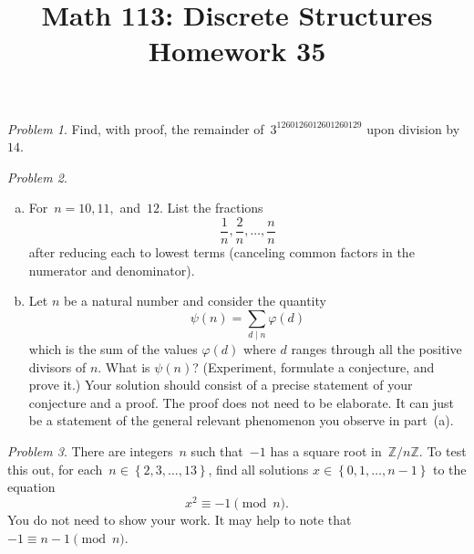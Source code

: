 \documentclass[11pt,twoside]{amsart}
\title{Math 113: Discrete Structures\\ Homework 35}
\theoremstyle{plain}
\theoremstyle{remark}
\newtheorem{prob}{Problem}
\theoremstyle{definition}
\theoremstyle{definition}
\newcommand{\ZZ}{\mathbb{Z}}
\begin{document}
\maketitle



\begin{prob}
  Find, with proof, the remainder of~$3^{1260126012601260129}$ upon division
  by~$14$.
\end{prob}

\begin{prob}\
  \begin{enumerate}[(a)]
    \item For~$n=10,11,$ and~$12$. List the fractions
      \[
	\frac{1}{n},\frac{2}{n},\dots,\frac{n}{n}
      \]
      after reducing each to lowest terms (canceling common factors in the
      numerator and denominator).
    \item Let $n$ be a natural number and consider the quantity
\[
  \psi(n)=\sum_{d\mid n}\varphi(d)
\]
which is the sum of the values $\varphi(d)$ where $d$ ranges through all the
positive divisors of $n$.  What is $\psi(n)$?  (Experiment, formulate a
conjecture, and prove it.) Your solution should consist of a precise statement
of your conjecture and a proof. The proof does not need to be elaborate.  It can
just be a statement of the general relevant phenomenon you observe in part~(a).
  \end{enumerate}
\end{prob}

\begin{prob} There are integers~$n$ such that~$-1$ has a square root in~$\ZZ/n\ZZ$.  To test this
  out, for each~$n\in\left\{ 2,3,\dots,13 \right\}$, find all solutions
  $x\in\left\{ 0,1,\dots,n-1 \right\}$ to the equation
  \[
    x^2\equiv -1\pmod{n}.
  \]
  You do not need to show your work.  It may help to note that~$-1\equiv n-1\pmod{n}$.
\end{prob}
\end{document}
